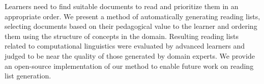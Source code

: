 Learners need to find suitable documents to read and prioritize them in an appropriate order. We present a method of automatically generating reading lists, selecting documents based on their pedagogical value to the learner and ordering them using the structure of concepts in the domain. Resulting reading lists related to computational linguistics were evaluated by advanced learners and judged to be near the quality of those generated by domain experts. We provide an open-source implementation of our method to enable future work on reading list generation.
